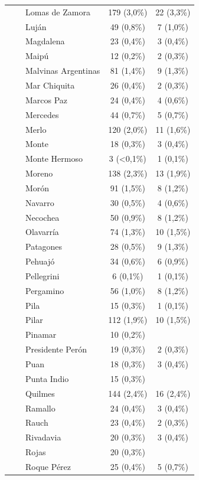 \documentclass[
  spanish,
  a4paper,
]{scrreprt}
\begin{document}
\begin{table}
{\begin{tabular*}{\linewidth}{@{\extracolsep{\fill}}lcc}
    Lomas de Zamora & 179 (3,0\%) & 22 (3,3\%) \\ 
    Luján & 49 (0,8\%) & 7 (1,0\%) \\ 
    Magdalena & 23 (0,4\%) & 3 (0,4\%) \\ 
    Maipú & 12 (0,2\%) & 2 (0,3\%) \\ 
    Malvinas Argentinas & 81 (1,4\%) & 9 (1,3\%) \\ 
    Mar Chiquita & 26 (0,4\%) & 2 (0,3\%) \\ 
    Marcos Paz & 24 (0,4\%) & 4 (0,6\%) \\ 
    Mercedes & 44 (0,7\%) & 5 (0,7\%) \\ 
    Merlo & 120 (2,0\%) & 11 (1,6\%) \\ 
    Monte & 18 (0,3\%) & 3 (0,4\%) \\ 
    Monte Hermoso & 3 (<0,1\%) & 1 (0,1\%) \\ 
    Moreno & 138 (2,3\%) & 13 (1,9\%) \\ 
    Morón & 91 (1,5\%) & 8 (1,2\%) \\ 
    Navarro & 30 (0,5\%) & 4 (0,6\%) \\ 
    Necochea & 50 (0,9\%) & 8 (1,2\%) \\ 
    Olavarría & 74 (1,3\%) & 10 (1,5\%) \\ 
    Patagones & 28 (0,5\%) & 9 (1,3\%) \\ 
    Pehuajó & 34 (0,6\%) & 6 (0,9\%) \\ 
    Pellegrini & 6 (0,1\%) & 1 (0,1\%) \\ 
    Pergamino & 56 (1,0\%) & 8 (1,2\%) \\ 
    Pila & 15 (0,3\%) & 1 (0,1\%) \\ 
    Pilar & 112 (1,9\%) & 10 (1,5\%) \\ 
    Pinamar & 10 (0,2\%) &  \\ 
    Presidente Perón & 19 (0,3\%) & 2 (0,3\%) \\ 
    Puan & 18 (0,3\%) & 3 (0,4\%) \\ 
    Punta Indio & 15 (0,3\%) &  \\ 
    Quilmes & 144 (2,4\%) & 16 (2,4\%) \\ 
    Ramallo & 24 (0,4\%) & 3 (0,4\%) \\ 
    Rauch & 23 (0,4\%) & 2 (0,3\%) \\ 
    Rivadavia & 20 (0,3\%) & 3 (0,4\%) \\ 
    Rojas & 20 (0,3\%) &  \\ 
    Roque Pérez & 25 (0,4\%) & 5 (0,7\%) \\ 

\end{tabular*}}
\end{table}
\end{document}
